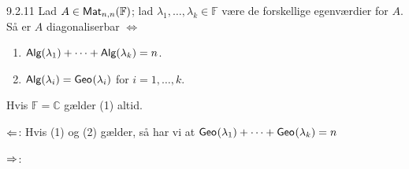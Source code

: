 \begin{saetning}{9.2.11}
	Lad $A\in \textsf{Mat}_{n,n}(\mathbb{F})$; lad $\lambda_1,\dotsc,\lambda_k\in
	\mathbb{F}$ være de forskellige egenværdier for $A$. Så er $A$ diagonaliserbar
	$\Leftrightarrow$
	\begin{enumerate}[(1)]
		\item $\textsf{Alg}(\lambda_1) + \dotsb + \textsf{Alg}(\lambda_k) = n$.
		\item $\textsf{Alg}(\lambda_i) = \textsf{Geo}_{}(\lambda_i)$ for $i = 1,\dotsc,k$.
	\end{enumerate}
\end{saetning}

\begin{bemaerk}
	Hvis $\mathbb{F} = \mathbb{C}$ gælder (1) altid.
\end{bemaerk}

\begin{bevis}
	$\Leftarrow$: Hvis (1) og (2) gælder, så har vi at $\textsf{Geo}_{}(\lambda_1) + \dotsb
	+ \textsf{Geo}_{}(\lambda_k) = n$

	\noindent
	$\Rightarrow$:
\end{bevis}

